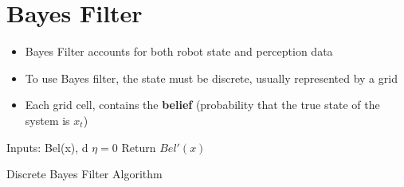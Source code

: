 \documentclass[../main.tex]{subfiles}
\begin{document}
\section{Bayes Filter}
  \begin{itemize}
    \item Bayes Filter accounts for both robot state and perception data
    \item To use Bayes filter, the state must be discrete, usually represented by a grid
    \item Each grid cell, contains the \textbf{belief} (probability that the true state of the system is $x_{t}$)
  \end{itemize}

  \begin{algorithm}[H]
      \SetAlgoLined
      Inputs: Bel(x), d\;
      $\eta = 0$\;
      Return $Bel'(x)$
      \caption{Discrete Bayes Filter Algorithm}
  \end{algorithm}
\end{document}
